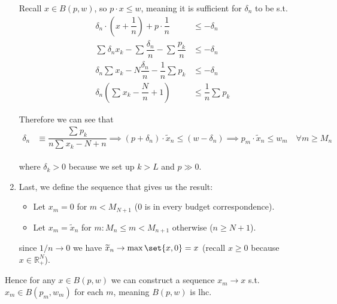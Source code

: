 \documentclass{article}
\begin{document}
\begin{enumerate}[1.]
    Recall $x \in B(p, w)$, so $p \cdot x \le w$, meaning it is sufficient for $\delta_n$ to be s.t.
    \begin{align*}
      \delta_n \cdot \left(x + \dfrac{1}{n}\right)
      +
      p \cdot \dfrac{1}{n}
      &
      \le
      - \delta_n
      \\
      \sum^{}_{} \delta_n x_k
      -
      \sum^{}_{} \dfrac{\delta_n}{n}
      -
      \sum^{}_{} \dfrac{p_k}{n}
      &
      \le
      -
      \delta_n
      \\
      \delta_n \sum^{}_{} x_k
      -
      N \dfrac{\delta_n}{n}
      -
      \dfrac{1}{n} \sum^{}_{} p_k
      &
      \le
      -
      \delta_n
      \\
      \delta_n
      \left(
        \sum^{}_{} x_k
        -
        \dfrac{N}{n}
        +
        1
      \right)
      &
      \le
      \dfrac{1}{n} \sum^{}_{} p_k
    \end{align*}

    Therefore we can see that
    \begin{align*}
      \delta_n
      &
      \equiv
      \dfrac{\sum^{}_{} p_k}{n \sum^{}_{} x_k - N + n}
      \implies
      (p + \delta_n) \cdot \widetilde{x}_n
      \le
      (w - \delta_n)
      \implies
      p_m \cdot \widetilde{x}_n
      \le
      w_m
      \quad
      \forall m \ge M_n
    \end{align*}

    where $\delta_k > 0$ because we set up $k > L$ and $p \gg 0$.

  \item Last, we define the sequence that gives us the result:
    \begin{itemize}[label=$\bullet$]
      \item Let $x_m = 0$ for $m < M_{N + 1}$ ($0$ is in every budget correspondence).

      \item Let $x_m = \widetilde{x}_n$ for $m: M_n \le m < M_{n + 1}$ otherwise ($n \ge N + 1$).
    \end{itemize}

    since $1/n \to 0$ we have $\widetilde{x}_n \to \max\set{x, 0} = x$ (recall $x \ge 0$ because $x \in \mathbb{R}^N_+$). 
\end{enumerate}

Hence for any $x \in B(p, w)$ we can construct a sequence $x_m \to x$ s.t. $x_m \in B(p_m, w_m)$ for each $m$, meaning $B(p, w)$ is lhc.

\clearpage
\printindex

\end{document}
